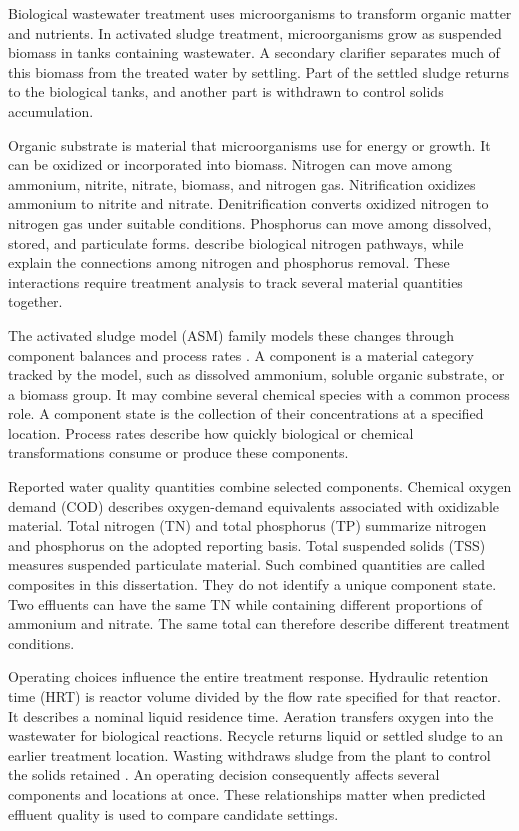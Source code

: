 Biological wastewater treatment uses microorganisms to transform organic matter and nutrients. In activated sludge treatment, microorganisms grow as suspended biomass in tanks containing wastewater. A secondary clarifier separates much of this biomass from the treated water by settling. Part of the settled sludge returns to the biological tanks, and another part is withdrawn to control solids accumulation.

Organic substrate is material that microorganisms use for energy or growth. It can be oxidized or incorporated into biomass. Nitrogen can move among ammonium, nitrite, nitrate, biomass, and nitrogen gas. Nitrification oxidizes ammonium to nitrite and nitrate. Denitrification converts oxidized nitrogen to nitrogen gas under suitable conditions. Phosphorus can move among dissolved, stored, and particulate forms. \citet{Duan2022} describe biological nitrogen pathways, while \citet{Wentzel1992} explain the connections among nitrogen and phosphorus removal. These interactions require treatment analysis to track several material quantities together.

The activated sludge model (ASM) family models these changes through component balances and process rates \citep{Henze1987,Henze1999,Henze2006}. A component is a material category tracked by the model, such as dissolved ammonium, soluble organic substrate, or a biomass group. It may combine several chemical species with a common process role. A component state is the collection of their concentrations at a specified location. Process rates describe how quickly biological or chemical transformations consume or produce these components.

Reported water quality quantities combine selected components. Chemical oxygen demand (COD) describes oxygen-demand equivalents associated with oxidizable material. Total nitrogen (TN) and total phosphorus (TP) summarize nitrogen and phosphorus on the adopted reporting basis. Total suspended solids (TSS) measures suspended particulate material. Such combined quantities are called composites in this dissertation. They do not identify a unique component state. Two effluents can have the same TN while containing different proportions of ammonium and nitrate. The same total can therefore describe different treatment conditions.

Operating choices influence the entire treatment response. Hydraulic retention time (HRT) is reactor volume divided by the flow rate specified for that reactor. It describes a nominal liquid residence time. Aeration transfers oxygen into the wastewater for biological reactions. Recycle returns liquid or settled sludge to an earlier treatment location. Wasting withdraws sludge from the plant to control the solids retained \citep{Henze2008}. An operating decision consequently affects several components and locations at once. These relationships matter when predicted effluent quality is used to compare candidate settings.

